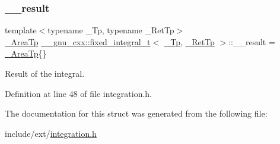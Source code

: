 \subsubsection{\texorpdfstring{\+\_\+\+\_\+result}{\_\_result}}
{\footnotesize\ttfamily template$<$typename \+\_\+\+Tp, typename \+\_\+\+Ret\+Tp$>$ \\
\hyperlink{struct____gnu__cxx_1_1fixed__integral__t_a68a11ba646968b5cebfc4cc7c1547478}{\+\_\+\+Area\+Tp} \hyperlink{struct____gnu__cxx_1_1fixed__integral__t}{\+\_\+\+\_\+gnu\+\_\+cxx\+::fixed\+\_\+integral\+\_\+t}$<$ \hyperlink{namespace____gnu__cxx_a3b19a9c800ca194374ef9172290f7d79}{\+\_\+\+Tp}, \hyperlink{namespace____gnu__cxx_a886e03ece3d53ff7fa6c098a40f93fa5}{\+\_\+\+Ret\+Tp} $>$\+::\+\_\+\+\_\+result = \hyperlink{struct____gnu__cxx_1_1fixed__integral__t_a68a11ba646968b5cebfc4cc7c1547478}{\+\_\+\+Area\+Tp}\{\}}



Result of the integral. 



Definition at line 48 of file integration.\+h.



The documentation for this struct was generated from the following file\+:\begin{DoxyCompactItemize}
\item 
include/ext/\hyperlink{integration_8h}{integration.\+h}\end{DoxyCompactItemize}
